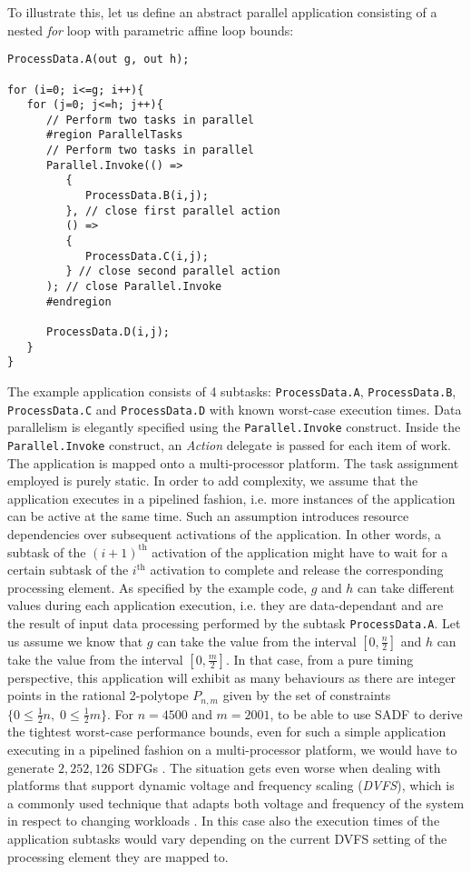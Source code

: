 \documentclass[]{eptcs}
\begin{document}
To illustrate this, let us define an abstract parallel application consisting of a nested \textit{for} loop with parametric affine loop bounds:
\begin{verbatim}
ProcessData.A(out g, out h);

for (i=0; i<=g; i++){
   for (j=0; j<=h; j++){
      // Perform two tasks in parallel
      #region ParallelTasks
      // Perform two tasks in parallel
      Parallel.Invoke(() =>
         {
            ProcessData.B(i,j);
         }, // close first parallel action
         () =>
         {
            ProcessData.C(i,j);	
         } // close second parallel action
      ); // close Parallel.Invoke
      #endregion

      ProcessData.D(i,j);
   }
}
\end{verbatim}
The example application consists of 4 subtasks: {\tt ProcessData.A}, {\tt ProcessData.B}, {\tt ProcessData.C}
and {\tt ProcessData.D} with known worst-case execution times. Data parallelism is elegantly specified using the {\tt Parallel.Invoke} construct. Inside the {\tt Parallel.Invoke} construct, an \textit{Action} delegate is passed for each item of work. The application is mapped onto a multi-processor platform. The task assignment employed is purely static. In order to add complexity, we assume that the application executes in a pipelined fashion, i.e. more instances of the application can be active at the same time. Such an assumption introduces resource dependencies over subsequent activations of the application. In other words, a subtask of the $(i+1)^{\mathrm{th}}$ activation of the application might have to wait for a certain subtask of the $i^{\mathrm{th}}$ activation to complete and release the corresponding processing element. As specified by the example code, $g$ and $h$ can take different values during each application execution, i.e. they are data-dependant and are the result of input data processing performed by the subtask  {\tt ProcessData.A}. Let us assume we know that $g$ can take the value from the interval $\left[0, \frac{n}{2}\right]$ and $h$ can take the value from the interval  $\left[0, \frac{m}{2}\right]$. In that case, from a pure timing perspective, this application will exhibit as many behaviours as there are integer points in the rational 2-polytope $ P_{n,m} $ given by the set of constraints $ \{0\le \frac{1}{2}n, \; 0\le \frac{1}{2}m\} $. For $ n=4500$ and $m=2001 $, to be able to use SADF to derive the tightest worst-case performance  bounds, even for such a simple application executing in a pipelined fashion on a multi-processor platform, we would have to generate $ 2,252,126 $ SDFGs \cite{2caluss:all}. The situation gets even worse when dealing with platforms that support dynamic voltage and frequency scaling (\textit{DVFS}), which is a commonly used technique that adapts both voltage and frequency of the system in respect to changing workloads \cite{2mack:all}. In this case also the execution times of the application subtasks would vary depending on the current DVFS setting of the processing element they are mapped to.
\end{document}
